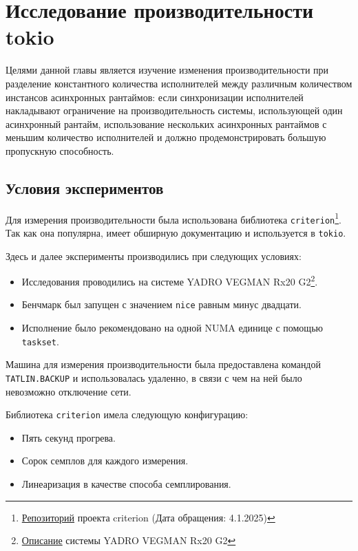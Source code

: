 
\section{Исследование производительности tokio}

Целями данной главы является изучение изменения производительности при разделение константного количества исполнителей между различным количеством инстансов асинхронных рантаймов: если синхронизации исполнителей накладывают ограничение на производительность системы, использующей один асинхронный рантайм, использование нескольких асинхронных рантаймов с меньшим количество исполнителей и должно продемонстрировать большую пропускную способность.

\subsection{Условия экспериментов}\label{experiment_environment}

Для измерения производительности была использована библиотека \verb|criterion|\footnote{\href{https://github.com/bheisler/criterion.rs}{Репозиторий} проекта criterion (Дата обращения: 4.1.2025)}. Так как она популярна, имеет обширную документацию и используется в \verb|tokio|.

Здесь и далее эксперименты производились при следующих условиях:

\begin{itemize}
    \item Исследования проводились на системе YADRO VEGMAN Rx20 G2\footnote{\href{https://yadro.com/ru/vegman/rx20g2/specs}{Описание} системы YADRO VEGMAN Rx20 G2}.
    \item Бенчмарк был запущен с значением \verb|nice| равным минус двадцати.
    \item Исполнение было рекомендовано на одной NUMA единице с помощью \verb|taskset|.
\end{itemize}

Машина для измерения производительности была предоставлена командой \verb|TATLIN.BACKUP| и использовалась удаленно, в связи с чем на ней было невозможно отключение сети.

Библиотека \verb|criterion| имела следующую конфигурацию:

\begin{itemize}
    \item Пять секунд прогрева.
    \item Сорок семплов для каждого измерения.
    \item Линеаризация в качестве способа семплирования.
\end{itemize}

